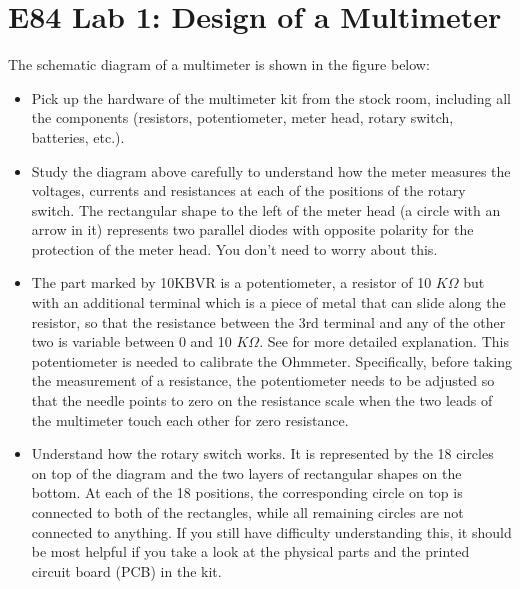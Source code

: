 \usepackage{html}
\textwidth 6.0in
\topmargin -0.5in
\oddsidemargin -0in
\evensidemargin -0.5in


\section*{E84 Lab 1: Design of a Multimeter}




The schematic diagram of a multimeter is shown in the figure below:

\begin{itemize}
  \item Pick up the hardware of the multimeter kit from the stock room,
    including all the components (resistors, potentiometer, meter head, 
    rotary switch, batteries, etc.). 

  \item Study the diagram above carefully to understand how the meter 
    measures the voltages, currents and resistances at each of the positions 
    of the rotary switch. The rectangular shape to the left of the meter 
    head (a circle with an arrow in it) represents two parallel diodes 
    with opposite polarity for the protection of the meter head. You don't
    need to worry about this. 

  \item The part marked by 10KBVR is a potentiometer, a resistor of 10
    $K\Omega$ but with an additional terminal which is a piece of metal 
    that can slide along the resistor, so that the resistance between the 
    3rd terminal and any of the other two is variable between 0 and 10 
    $K\Omega$. See
    for more detailed explanation. This potentiometer is needed to calibrate
    the Ohmmeter. Specifically, before taking the measurement of a resistance,
    the potentiometer needs to be adjusted so that the needle points to 
    zero on the resistance scale when the two leads of the multimeter touch
    each other for zero resistance.
    
  \item Understand how the rotary switch works. It is represented by the 
    18 circles on top of the diagram and the two layers of rectangular shapes
    on the bottom. At each of the 18 positions, the corresponding circle on 
    top is connected to both of the rectangles, while all remaining circles 
    are not connected to anything. If you still have difficulty understanding 
    this, it should be most helpful if you take a look at the physical parts 
    and the printed circuit board (PCB) in the kit.


\end{itemize}
